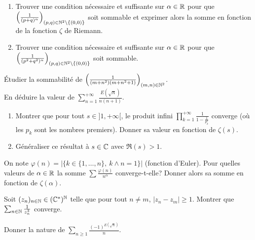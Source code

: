 \begin{exercise}
	\phantom{}
	\begin{enumerate}
		\item
		Trouver une condition nécessaire et suffisante sur $\alpha\in\mathbb{R}$ pour que
		$\Bigl(\frac{1}{(p+q)^{\alpha}}\Bigr)_{(p,q)\in\mathbb{N}^{2}\setminus\{(0,0)\}}$
		soit sommable et exprimer alors la somme en fonction de la fonction
		$\zeta$ de Riemann.
		\item
		Trouver une condition nécessaire et suffisante sur $\alpha\in\mathbb{R}$ pour que
		$\Bigl(\frac{1}{(p^{2}+q^{2})^{\alpha}}\Bigr)_{(p,q)\in\mathbb{N}^{2}\setminus\{(0,0)\}}$
		soit sommable.
	\end{enumerate}
\end{exercise}

\begin{exercise}
	Étudier la sommabilité de
	$\Bigl(\frac{1}{(m+n^{2})(m+n^{2}+1)}\Bigr)_{(m,n)\in\mathbb{N}^{2}}$.\\
	En déduire la valeur de $\sum_{n=1}^{+\infty}\frac{E(\sqrt{n})}{n(n+1)}$.
\end{exercise}

\begin{exercise}
	\phantom{}
	\begin{enumerate}
		\item
		Montrer que pour tout $s\in]1,+\infty[$, le produit infini
		$\prod_{k=1}^{+\infty}\frac{1}{1-\frac{1}{p_{k}^{s}}}$ converge (où les
		$p_{k}$ sont les nombres premiers). Donner sa valeur en fonction de
		$\zeta(s)$.
		\item
		Généraliser ce résultat à $s\in\mathbb{C}$ avec $\Re(s)>1$.
	\end{enumerate}
\end{exercise}

\begin{exercise}
	On note $\varphi(n)=\vert\{k\in\{1,\dots,n\},~k\wedge n=1\}\vert$ (fonction
	d'Euler). Pour quelles valeurs de $\alpha\in\mathbb{R}$ la somme $\sum
	\frac{\varphi(n)}{n^{\alpha}}$ converge-t-elle? Donner alors sa somme en
	fonction de $\zeta(\alpha)$.
\end{exercise}

\begin{exercise}
	Soit $(z_{n})_{n\in\mathbb{N}}\in(\mathbb{C}^{*})^{\mathbb{N}}$ telle que pour tout $n\neq m$, $\vert
	z_{n}-z_{m}\vert\geqslant1$. Montrer que $\sum_{n\in\mathbb{N}}\frac{1}{z_{n}^{3}}$
	converge.
\end{exercise}

\begin{exercise}
	Donner la nature de $\sum_{n\geqslant1}\frac{(-1)^{E(\sqrt{n})}}{n}$.
\end{exercise}

